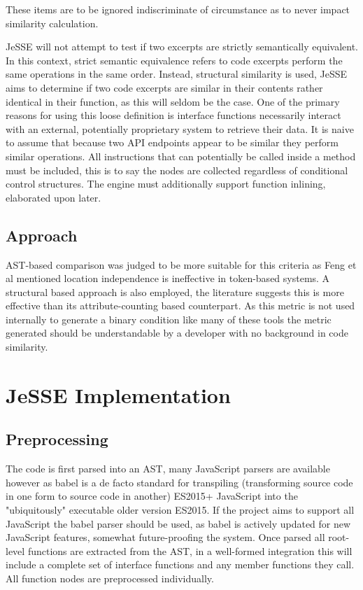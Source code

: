 \documentclass[jou,apacite]{apa6}
\begin{document}
These items are to be ignored indiscriminate of circumstance as to never impact similarity calculation. 

JeSSE will not attempt to test if two excerpts are strictly semantically equivalent. In this context,  strict semantic equivalence refers to code excerpts perform the same operations in the same order. Instead, structural similarity is used, JeSSE aims to determine if two code excerpts are similar in their contents rather identical in their function, as this will seldom be the case. One of the primary reasons for using this loose definition is interface functions necessarily interact with an external, potentially proprietary system to retrieve their data. It is naive to assume that because two API endpoints appear to be similar they perform similar operations. 
All instructions that can potentially be called inside a method must be included, this is to say the nodes are collected regardless of conditional control structures. The engine must additionally support function inlining, elaborated upon later.

\subsection{Approach}
AST-based comparison was judged to be more suitable for this criteria as Feng et al mentioned location independence is ineffective in token-based systems. A structural based approach is also employed, the literature suggests this is more effective than its attribute-counting based counterpart. As this metric is not used internally to generate a binary condition like many of these tools the metric generated should be understandable by a developer with no background in code similarity.

\clearpage

\section{JeSSE Implementation}
\subsection{Preprocessing}
The code is first parsed into an AST, many JavaScript parsers are available however as babel is a de facto standard for transpiling (transforming source code in one form to source code in another) ES2015+ JavaScript into the "ubiquitously" executable older version ES2015. If the project aims to support all JavaScript the babel parser should be used, as babel is actively updated for new JavaScript features, somewhat future-proofing the system. Once parsed all root-level functions are extracted from the AST,  in a well-formed integration this will include a complete set of interface functions and any member functions they call. All function nodes are preprocessed individually.
\end{document}
